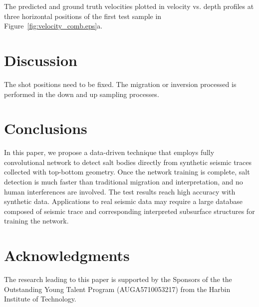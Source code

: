 \documentclass{segabs}
\begin{document}
{The predicted and ground truth velocities plotted in velocity vs. depth profiles at three horizontal positions of the first test sample in Figure~\ref{fig:velocity_comb.eps}a}.


\section{Discussion}
The shot positions need to be fixed.
The migration or inversion processed is performed in the down and up sampling processes. 


\section{Conclusions}
In this paper, we propose a data-driven technique that employs fully convolutional network to detect salt bodies directly from synthetic seismic traces collected with top-bottom geometry. Once the network training is complete, salt detection is much faster than traditional migration and interpretation, and no human interferences are involved. The test results reach high accuracy with synthetic data. Applications to real seismic data may require a large database composed of seismic trace and corresponding interpreted subsurface structures for training the network.


\section{Acknowledgments}

The research leading to this paper is supported by the Sponsors of the
the Outstanding Young Talent Program (AUGA5710053217) from the Harbin Institute of Technology. 

\newpage


\end{document}
